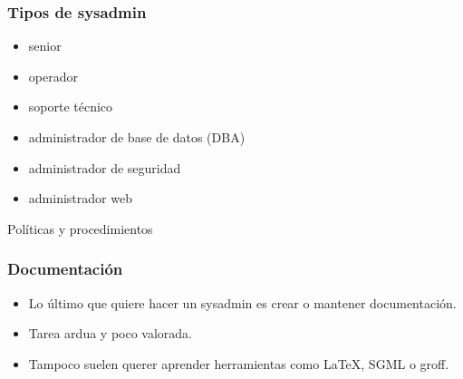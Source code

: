 \documentclass{beamer}
\begin{document}

\begin{frame}
\frametitle{Tipos de sysadmin}

\begin{itemize}
\item senior
\item operador
\item soporte técnico 
\item administrador de base de datos (DBA)
\item administrador de seguridad
\item administrador web
\end{itemize}
\end{frame}





\begin{frame}

\begin{center}
\huge{Políticas y procedimientos}
\end{center}

\end{frame}


\begin{frame}
\frametitle{Documentación}

\begin{itemize}
\item Lo último que quiere hacer un sysadmin es crear o mantener documentación. 
\item Tarea ardua y poco valorada. 
\item Tampoco suelen querer aprender herramientas como LaTeX, SGML o groff.
\end{itemize}

\end{frame}


\end{document}
